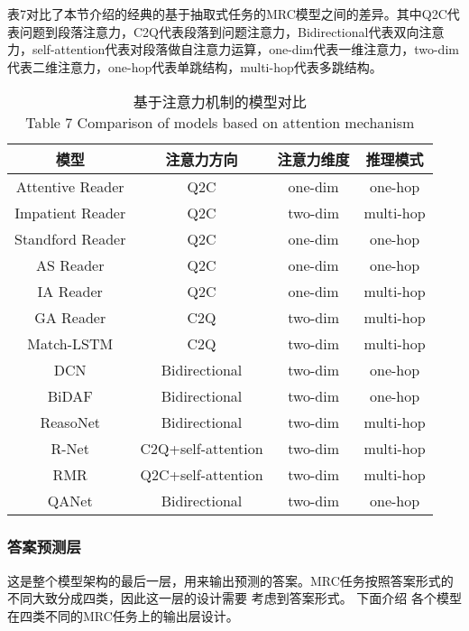 表7对比了本节介绍的经典的基于抽取式任务的MRC模型之间的差异。其中Q2C代表问题到段落注意力，C2Q代表段落到问题注意力，Bidirectional代表双向注意力，self-attention代表对段落做自注意力运算，one-dim代表一维注意力，two-dim代表二维注意力，one-hop代表单跳结构，multi-hop代表多跳结构。
\begin{table}[ht]
	\centering
	\caption{基于注意力机制的模型对比 \\ Table 7 Comparison of models based on attention mechanism}
	\begin{tabular}{c c c c}
		\toprule
		模型&注意力方向&注意力维度&推理模式 \\
		\midrule
		Attentive Reader\upcite{Hermann}&Q2C&one-dim&one-hop \\
		\midrule
		Impatient Reader\upcite{Hermann}&Q2C&two-dim&multi-hop \\
		\midrule
		Standford Reader\upcite{AR}&Q2C&one-dim&one-hop \\
		\midrule
		AS Reader\upcite{ASR}&Q2C&one-dim&one-hop \\
		\midrule
		IA Reader\upcite{IAReader}&Q2C&one-dim&multi-hop \\
		\midrule
		GA Reader\upcite{GAReader}&C2Q&two-dim&multi-hop \\
		\midrule
		Match-LSTM\upcite{MatchLSTM}&C2Q&two-dim&multi-hop \\
		\midrule
		DCN\upcite{DCN}&Bidirectional&two-dim&one-hop \\           
		\midrule
		BiDAF\upcite{BiDAF}&Bidirectional&two-dim&one-hop \\
		\midrule
		ReasoNet\upcite{Reasonet}&Bidirectional&two-dim&multi-hop\\
		\midrule
		R-Net\upcite{RNet}&C2Q+self-attention&two-dim&multi-hop \\
		\midrule
		RMR\upcite{RMR}&Q2C+self-attention&two-dim&multi-hop \\
		\midrule
		QANet\upcite{QANet}&Bidirectional&two-dim&one-hop\\
		\bottomrule
	\end{tabular}
\end{table}



\subsubsection{答案预测层}
这是整个模型架构的最后一层，用来输出预测的答案。MRC任务按照答案形式的不同大致分成四类，因此这一层的设计需要
考虑到答案形式。
%
下面介绍
各个模型在四类不同的MRC任务上的输出层设计。


